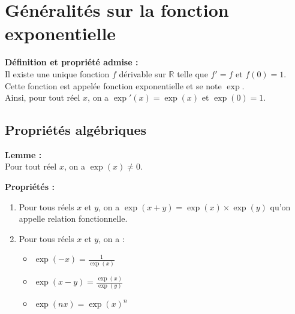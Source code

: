 \documentclass[11pt,a4paper]{article}
\title{\doctitre}
\author{\docniveau \\ \doctheme\text{ - }\doctype}
\date{}
\begin{document}
\maketitle
\pagestyle{custom}
\thispagestyle{custom}

\section{Généralités sur la fonction exponentielle}

\begin{mdframed}[style=definitionStyle]
    \textbf{Définition et propriété admise :} ~\\
    Il existe une unique fonction $f$ dérivable sur $\mathbb{R}$ telle que $f'=f$ et $f(0)=1$. \\
    Cette fonction est appelée fonction exponentielle et se note $\exp$. \\
    Ainsi, pour tout réel $x$, on a $\exp'(x)=\exp(x)$ et $\exp(0)=1$.
\end{mdframed}

\subsection{Propriétés algébriques}

\begin{mdframed}[style=proprieteStyle]
    \textbf{Lemme :} ~\\
    Pour tout réel $x$, on a $\exp(x)\not=0$.
\end{mdframed}

\begin{mdframed}[style=proprieteStyle]
    \textbf{Propriétés :}
    \begin{enumerate}
        \item Pour tous réels $x$ et $y$, on a $\exp(x+y)=\exp(x)\times\exp(y)$ qu'on appelle relation fonctionnelle.
        \item Pour tous réels $x$ et $y$, on a :
        \begin{itemize}
            \item $\displaystyle\exp(-x)=\frac{1}{\exp(x)}$
            \item $\displaystyle\exp(x-y)=\frac{\exp(x)}{\exp(y)}$ 
            \item $\displaystyle\exp(nx)=\exp(x)^n$ 
        \end{itemize}
    \end{enumerate}
\end{mdframed}
\end{document}
